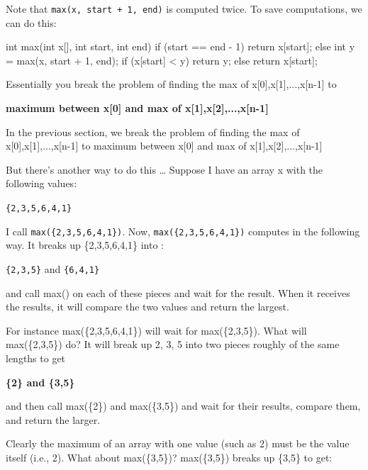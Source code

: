 Note that \texttt{max(x, start + 1, end)} is computed twice. To save
computations, we can do this:

\begin{consolethree}[escapeinside=||]
int max(int x[], int start, int end)
{
    if (start == end - 1)
    {
        return x[start];
    }
    else
    {
        int y = max(x, start + 1, end);
        if (x[start] < y)
        {
            return y;
        }
        else
        {
            return x[start];
        }
    }
}
\end{consolethree}

Essentially you break the problem of finding the max of
x[0],x[1],...,x[n-1] to

\textbf{maximum between x[0] and max of x[1],x[2],...,x[n-1]}







\newpage{}

In the previous section, we break the problem of finding the max of x[0],x[1],...,x[n-1] to maximum between x[0] and max of x[1],x[2],...,x[n-1]

But there's another way to do this \ldots{} Suppose I have an array x with the following values:

\verb!{2,3,5,6,4,1}!

I call \verb!max({2,3,5,6,4,1})!. Now, \verb!max({2,3,5,6,4,1})! computes in the following way. It breaks up \{2,3,5,6,4,1\} into :

\verb!{2,3,5}! and \verb!{6,4,1}!

and call max() on each of these pieces and wait for the result. When it receives the results, it will compare the two values and return the largest.

For instance max(\{2,3,5,6,4,1\}) will wait for max(\{2,3,5\}). What will max(\{2,3,5\}) do? It will break up 2, 3, 5 into two pieces roughly of the same lengths to get

\textbf{\{2\} and \{3,5\}}

and then call max(\{2\}) and max(\{3,5\}) and wait for their results, compare them, and return the larger.

Clearly the maximum of an array with one value (such as 2) must be the value itself (i.e., 2). What about max(\{3,5\})? max(\{3,5\}) breaks up \{3,5\} to get:

